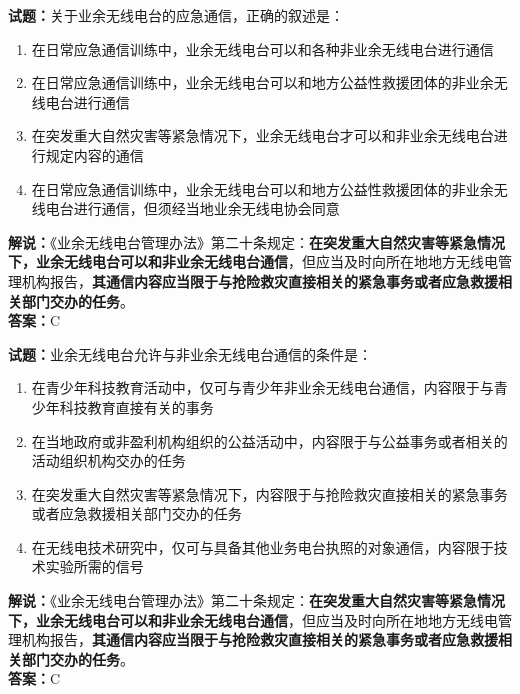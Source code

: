\documentclass{ctexbook}
\begin{document}
\vspace{\baselineskip}

\noindent\textbf{试题：}关于业余无线电台的应急通信，正确的叙述是：
\begin{enumerate}[leftmargin=3em]
  \item 在日常应急通信训练中，业余无线电台可以和各种非业余无线电台进行通信
  \item 在日常应急通信训练中，业余无线电台可以和地方公益性救援团体的非业余无线电台进行通信
  \item 在突发重大自然灾害等紧急情况下，业余无线电台才可以和非业余无线电台进行规定内容的通信
  \item 在日常应急通信训练中，业余无线电台可以和地方公益性救援团体的非业余无线电台进行通信，但须经当地业余无线电协会同意
\end{enumerate}
\noindent\textbf{解说：}《业余无线电台管理办法》第二十条规定：\textbf{在突发重大自然灾害等紧急情况下，业余无线电台可以和非业余无线电台通信}，但应当及时向所在地地方无线电管理机构报告，\textbf{其通信内容应当限于与抢险救灾直接相关的紧急事务或者应急救援相关部门交办的任务}。\\\noindent\textbf{答案：}C

\vspace{\baselineskip}

\noindent\textbf{试题：}业余无线电台允许与非业余无线电台通信的条件是：
\begin{enumerate}[leftmargin=3em]
  \item 在青少年科技教育活动中，仅可与青少年非业余无线电台通信，内容限于与青少年科技教育直接有关的事务
  \item 在当地政府或非盈利机构组织的公益活动中，内容限于与公益事务或者相关的活动组织机构交办的任务
  \item 在突发重大自然灾害等紧急情况下，内容限于与抢险救灾直接相关的紧急事务或者应急救援相关部门交办的任务
  \item 在无线电技术研究中，仅可与具备其他业务电台执照的对象通信，内容限于技术实验所需的信号
\end{enumerate}
\noindent\textbf{解说：}《业余无线电台管理办法》第二十条规定：\textbf{在突发重大自然灾害等紧急情况下，业余无线电台可以和非业余无线电台通信}，但应当及时向所在地地方无线电管理机构报告，\textbf{其通信内容应当限于与抢险救灾直接相关的紧急事务或者应急救援相关部门交办的任务}。\\\noindent\textbf{答案：}C

\vspace{\baselineskip}
\end{document}
